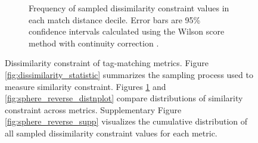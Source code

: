 \begin{figure}[!htbp]
\begin{center}
\begin{subfigure}[b]{\columnwidth}
\caption{
Frequency of sampled dissimilarity constraint values in each match distance decile.
Error bars are 95\% confidence intervals calculated using the Wilson score method with continuity correction \citep{newcombe1998two}.
}
\label{fig:sphere_reverse_barplot}
\end{subfigure}

\caption{
Dissimilarity constraint of tag-matching metrics.
Figure \ref{fig:dissimilarity_statistic} summarizes the sampling process used to measure similarity constraint.
Figures \ref{fig:sphere_reverse_barplot} and \ref{fig:sphere_reverse_distnplot} compare distributions of similarity constraint across metrics.
Supplementary Figure \ref{fig:sphere_reverse_supp} visualizes the cumulative distribution of all sampled dissimilarity constraint values for each metric.
}
\label{fig:sphere_reverse}

\end{center}
\end{figure}

